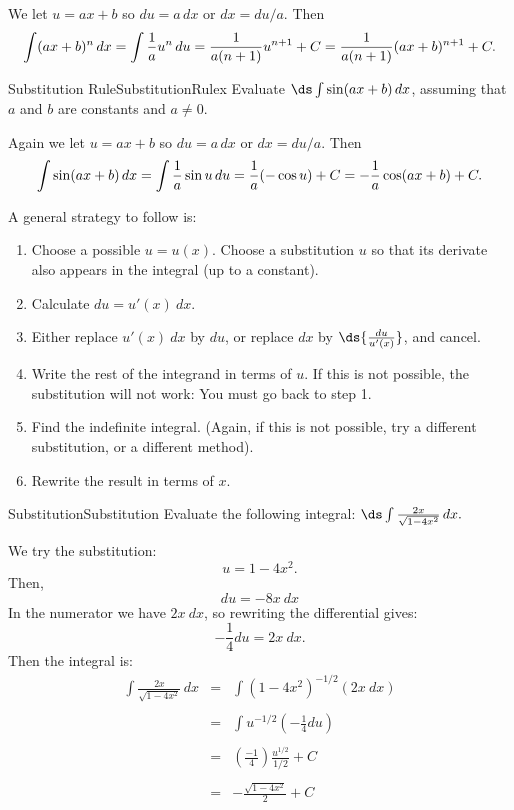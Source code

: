 \begin{solution} 
We let $u=ax+b$ so $du=a\,dx$ or $dx=du/a$. Then
$$
  \int(ax+b)^n\,dx=\int {1\over a} u^n\,du={1\over a(n+1)}u^{n+1}+C=
  {1\over a(n+1)}(ax+b)^{n+1}+C.
$$
\end{solution}

\begin{example}{Substitution Rule}{SubstitutionRulex}
Evaluate $\ds\int \sin(ax+b)\,dx$, assuming that $a$ and $b$ are
constants and $a\not=0$.
\end{example}

\begin{solution} 
Again we let $u=ax+b$ so $du=a\,dx$ or $dx=du/a$. Then
$$
  \int\sin(ax+b)\,dx=\int {1\over a} \sin u\,du={1\over a}(-\cos u)+C=
-{1\over a}\cos(ax+b)+C.
$$
\end{solution}

\begin{formulabox}
A general strategy to follow is:
\begin{enumerate}\setlength{\itemsep}{0 in}
\item Choose a possible $u=u(x)$.  Choose a substitution $u$ so that its derivate also appears in the integral (up to a constant).
\item Calculate $du=u'(x)~dx$.
\item Either replace $u'(x)~dx$ by $du$, or replace $dx$ by $\ds{\frac{du}{u'(x)}}$, and cancel.
\item Write the rest of the integrand in terms of $u$. If this is not possible, the substitution will not work: You must go back to step 1.
\item Find the indefinite integral. (Again, if this is not possible, try a different substitution, or a different method).
\item Rewrite the result in terms of $x$.
\end{enumerate}
\end{formulabox}

\begin{example}{Substitution}{Substitution}
Evaluate the following integral: $\ds\int \frac{2x}{\sqrt{1-4x^2}}\,dx.$
\end{example}

\begin{solution} 
We try the substitution:
$$u=1-4x^2.$$
Then,
$$du=-8x~dx$$
In the numerator we have $2x~dx$, so rewriting the differential gives:
$$-\frac{1}{4}du=2x~dx.$$
Then the integral is:
\begin{eqnarray*}
\int \frac{2x}{\sqrt{1-4x^2}}\,dx&=&\int \left(1-4x^2\right)^{-1/2}(2x~dx)\\
\\
&=&\int u^{-1/2}\left(-\frac{1}{4}du\right)\\
\\
&=&\left(\frac{-1}{4}\right)\frac{u^{1/2}}{1/2}+C\\
\\
&=&-\frac{\sqrt{1-4x^2}}{2}+C
\end{eqnarray*}
\end{solution}



